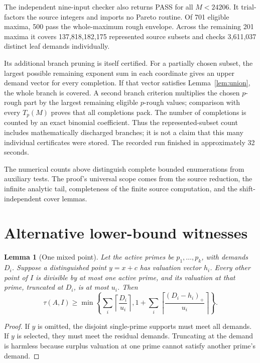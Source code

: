 \documentclass[11pt,a4paper]{article}
\newtheorem{lemma}[theorem]{Lemma}
\begin{document}
The independent nine-input checker also returns PASS for all $M<24206$. It trial-factors the source integers and imports no Pareto routine. Of 701 eligible maxima, 500 pass the whole-maximum rough envelope. Across the remaining 201 maxima it covers 137,818,182,175 represented source subsets and checks 3,611,037 distinct leaf demands individually.

Its additional branch pruning is itself certified. For a partially chosen subset, the largest possible remaining exponent sum in each coordinate gives an upper demand vector for every completion. If that vector satisfies Lemma~\ref{lem:union}, the whole branch is covered. A second branch criterion multiplies the chosen $p$-rough part by the largest remaining eligible $p$-rough values; comparison with every $T_p(M)$ proves that all completions pack. The number of completions is counted by an exact binomial coefficient. Thus the represented-subset count includes mathematically discharged branches; it is not a claim that this many individual certificates were stored. The recorded run finished in approximately 32 seconds.

The numerical counts above distinguish complete bounded enumerations from auxiliary tests. The proof's universal scope comes from the source reduction, the infinite analytic tail, completeness of the finite source computation, and the shift-independent cover lemmas.

\section{Alternative lower-bound witnesses}
\begin{lemma}[One mixed point]\label{lem:hub}
Let the active primes be $p_1,\ldots,p_k$, with demands $D_i$. Suppose a distinguished point $y=x+c$ has valuation vector $h_i$. Every other point of $I$ is divisible by at most one active prime, and its valuation at that prime, truncated at $D_i$, is at most $u_i$. Then
\[
 \tau(A,I)\ge
 \min\left\{\sum_i\left\lceil\frac{D_i}{u_i}\right\rceil,
  1+\sum_i\left\lceil\frac{(D_i-h_i)_+}{u_i}\right\rceil\right\}.
\]
\end{lemma}
\begin{proof}
If $y$ is omitted, the disjoint single-prime supports must meet all demands. If $y$ is selected, they must meet the residual demands. Truncating at the demand is harmless because surplus valuation at one prime cannot satisfy another prime's demand.
\end{proof}
\end{document}

